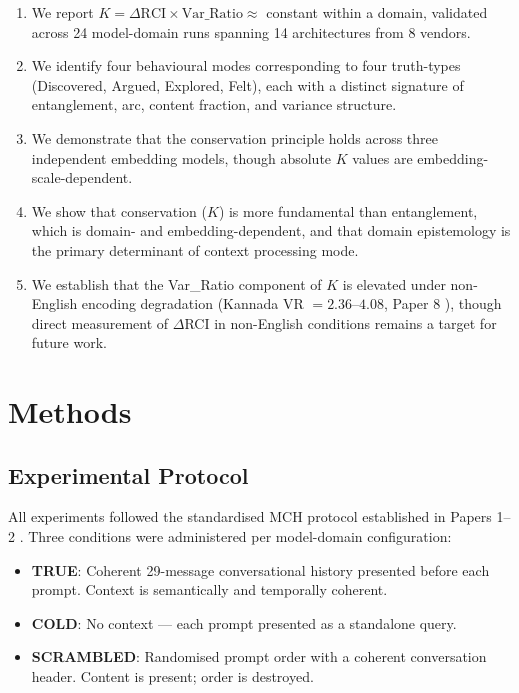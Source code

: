 \documentclass[11pt,a4paper]{article}
\begin{document}
\begin{enumerate}
    \item We report $K = \Delta\text{RCI} \times \text{Var\_Ratio} \approx$ constant
    within a domain, validated across 24 model-domain runs spanning 14 architectures
    from 8 vendors.
    \item We identify four behavioural modes corresponding to four truth-types
    (Discovered, Argued, Explored, Felt), each with a distinct signature of entanglement,
    arc, content fraction, and variance structure.
    \item We demonstrate that the conservation principle holds across three independent
    embedding models, though absolute $K$ values are embedding-scale-dependent.
    \item We show that conservation ($K$) is more fundamental than entanglement, which
    is domain- and embedding-dependent, and that domain epistemology is the primary
    determinant of context processing mode.
    \item We establish that the Var\_Ratio component of $K$ is elevated under
    non-English encoding degradation (Kannada VR $= 2.36$--$4.08$, Paper 8
    \citep{laxman2026h}), though direct measurement of $\Delta$RCI in non-English
    conditions remains a target for future work.
\end{enumerate}

\section{Methods}

\subsection{Experimental Protocol}

All experiments followed the standardised MCH protocol established in Papers 1--2
\citep{laxman2026a,laxman2026b}. Three conditions were administered per model-domain
configuration:

\begin{itemize}
    \item \textbf{TRUE}: Coherent 29-message conversational history presented before
    each prompt. Context is semantically and temporally coherent.
    \item \textbf{COLD}: No context --- each prompt presented as a standalone query.
    \item \textbf{SCRAMBLED}: Randomised prompt order with a coherent conversation
    header. Content is present; order is destroyed.
\end{itemize}
\end{document}
